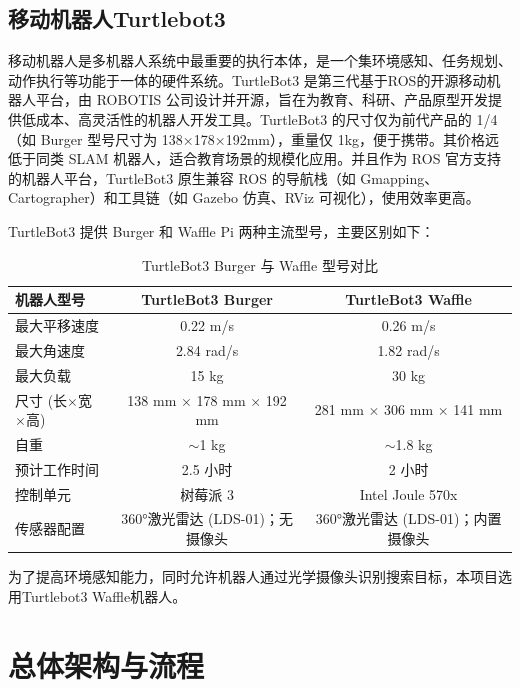 \subsection{移动机器人Turtlebot3}
移动机器人是多机器人系统中最重要的执行本体，是一个集环境感知、任务规划、
动作执行等功能于一体的硬件系统。TurtleBot3 是第三代基于ROS的开源移动机器人平台，由 ROBOTIS 公司设计并开源，旨在为教育、科研、产品原型开发提供低成本、高灵活性的机器人开发工具。TurtleBot3 的尺寸仅为前代产品的 1/4（如 Burger 型号尺寸为 138×178×192mm），重量仅 1kg，便于携带。其价格远低于同类 SLAM 机器人，适合教育场景的规模化应用。并且作为 ROS 官方支持的机器人平台，TurtleBot3 原生兼容 ROS 的导航栈（如 Gmapping、Cartographer）和工具链（如 Gazebo 仿真、RViz 可视化），使用效率更高。

TurtleBot3 提供 Burger 和 Waffle Pi 两种主流型号，主要区别如下：
\begin{table}[ht]
  \centering
    \begin{tabular}{lcc}
      \toprule
      机器人型号 & TurtleBot3 Burger & TurtleBot3 Waffle \\
      \midrule
      最大平移速度   & 0.22 m/s                   & 0.26 m/s                   \\
      最大角速度     & 2.84 rad/s                 & 1.82 rad/s                 \\
      最大负载       & 15 kg                      & 30 kg                      \\
      尺寸 (长$\times$宽$\times$高) & 138 mm $\times$ 178 mm $\times$ 192 mm & 281 mm $\times$ 306 mm $\times$ 141 mm \\
      自重           & $\sim$1 kg                 & $\sim$1.8 kg               \\
      预计工作时间   & 2.5 小时                   & 2 小时                     \\
      控制单元       & 树莓派 3                  & Intel Joule 570x           \\
      传感器配置     & 360°激光雷达 (LDS-01)；无摄像头 & 360°激光雷达 (LDS-01)；内置摄像头\\
      \bottomrule
    \end{tabular}
  \caption{TurtleBot3 Burger 与 Waffle 型号对比}
  \label{tab:turtlebot3_comparison}
\end{table}

为了提高环境感知能力，同时允许机器人通过光学摄像头识别搜索目标，本项目选用Turtlebot3 Waffle机器人。

\section{总体架构与流程}

